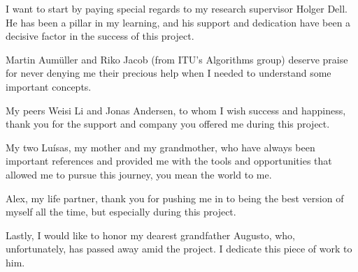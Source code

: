 
I want to start by paying special regards to my research supervisor Holger Dell. He has been a pillar in my learning, and his support and dedication have been a decisive factor in the success of this project.

Martin Aumüller and Riko Jacob (from ITU's Algorithms group) deserve praise for never denying me their precious help when I needed to understand some important concepts.

My peers Weisi Li and Jonas Andersen, to whom I wish success and happiness, thank you for the support and company you offered me during this project.

My two Luísas, my mother and my grandmother, who have always been important references and provided me with the tools and opportunities that allowed me to pursue this journey, you mean the world to me.

Alex, my life partner, thank you for pushing me in to being the best version of myself all the time, but especially during this project.

Lastly, I would like to honor my dearest grandfather Augusto, who, unfortunately, has passed away amid the project. I dedicate this piece of work to him.